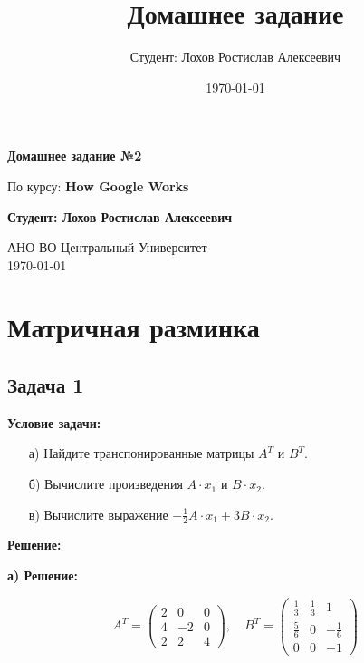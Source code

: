 \documentclass[a4paper,12pt]{article}
\title{Домашнее задание}
\author{Студент: Лохов Ростислав Алексеевич}
\date{\today}
\begin{document}
\begin{titlepage}
    \centering
    \vspace*{1cm}

    \Huge
    \textbf{Домашнее задание №2}

    \vspace{0.5cm}
    \LARGE
    По курсу: \textbf{How Google Works}

    \vspace{1.5cm}

    \textbf{Студент: Лохов Ростислав Алексеевич}

    \vfill

    \Large
    АНО ВО Центральный Университет\\
    \vspace{0.3cm}
    \today

\end{titlepage}

\tableofcontents
\newpage

\section{Матричная разминка}

\subsection{Задача 1}
\textbf{Условие задачи:}
\begin{itemize}
    \item[а)] Найдите транспонированные матрицы \( A^T \) и \( B^T \).
    \item[б)] Вычислите произведения \( A \cdot x_1 \) и \( B \cdot x_2 \).
    \item[в)] Вычислите выражение \( -\frac{1}{2} A \cdot x_1 + 3 B \cdot x_2 \).
\end{itemize}

\textbf{Решение:}

\textbf{а) Решение:}
\begin{itemize}
       \[
   A^T = \begin{pmatrix}
   2 & 0 & 0 \\
   4 & -2 & 0 \\
   2 & 2 & 4
   \end{pmatrix}, \quad
   B^T = \begin{pmatrix}
   \frac{1}{3} & \frac{1}{3} & 1 \\
   \frac{5}{6} & 0 & -\frac{1}{6} \\
   0 & 0 & -1
   \end{pmatrix}
   \]
\end{itemize}
\end{document}
